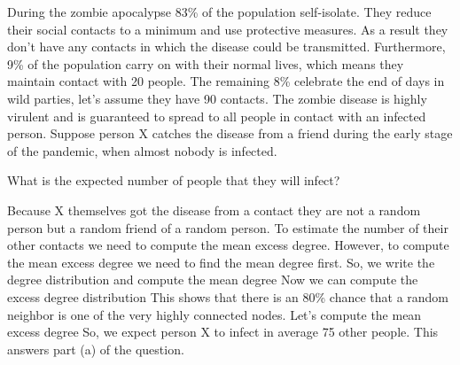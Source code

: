 During the zombie apocalypse 83\% of the population self-isolate. They reduce their social contacts to a minimum and use protective measures. As a result they don't have any contacts in which the disease could be transmitted. Furthermore, 9\% of the population carry on with their normal lives, which means they maintain contact with 20 people. The remaining 8\% celebrate the end of days in wild parties, let's assume they have 90 contacts. The zombie disease is highly virulent and is guaranteed to spread to all people in contact with an infected person. Suppose person X catches the disease from a friend during the early stage of the pandemic, when almost nobody is infected. 

\subquestion What is the expected number of people that they will infect? 

\solution
Because X themselves got the disease from a contact they are not a random person but a random friend of a random person. To estimate the number of their other contacts we need to compute the mean excess degree. However, to compute the mean excess degree we need to find the mean degree first. So, we write the degree distribution
and compute the mean degree
Now we can compute the excess degree distribution
This shows that there is an 80\% chance that a random neighbor is one of the very highly connected nodes. Let's compute the mean excess degree
So, we expect person X to infect in average 75 other people. This answers part (a) of the question. 

